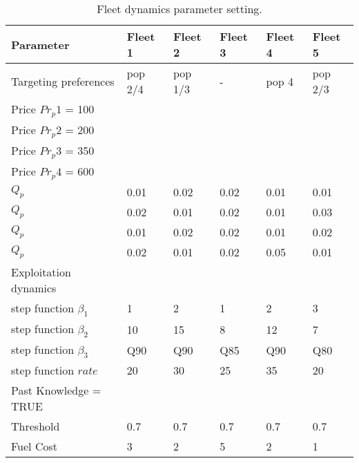\begin{table}[!ht]
\caption{Fleet dynamics parameter setting.}
\begin{tabular}{ p{4cm } p{1.2cm} p{1.2cm} p{1.2cm} p{1.2cm} p{1.2cm}}
	\hline
	Parameter & Fleet 1 & Fleet 2 & Fleet 3 & Fleet 4 & Fleet 5 \\
	\hline
	Targeting preferences & pop 2/4 & pop 1/3 & - & pop 4 & pop
	2/3 \\
	\hline
	Price $Pr_{p}1$ = 100 & & & & & \\
	Price $Pr_{p}2$ = 200 & & & & & \\
	Price $Pr_{p}3$ = 350 & & & & & \\
	Price $Pr_{p}4$ = 600 & & & & & \\
	$Q_{p}$ & 0.01 & 0.02 & 0.02 & 0.01 & 0.01 \\
	$Q_{p}$ & 0.02 & 0.01 & 0.02 & 0.01 & 0.03\\
	$Q_{p}$ & 0.01 & 0.02 & 0.02 & 0.01 & 0.02 \\
	$Q_{p}$ & 0.02 & 0.01 & 0.02 & 0.05 & 0.01 \\
	\hline
	Exploitation dynamics &&&& \\
	\hline
	step function $\beta_1$ & 1 & 2 & 1 & 2 & 3 \\
	step function $\beta_2$ & 10 & 15 & 8 & 12 & 7 \\
	step function $\beta_3$ & Q90 & Q90 & Q85 & Q90 & Q80 \\
	step function $rate$ & 20 & 30 & 25 & 35 & 20 \\
	Past Knowledge = TRUE & & & & & \\
	Threshold & 0.7 & 0.7 & 0.7 & 0.7 & 0.7 \\
	Fuel Cost & 3 & 2 & 5 & 2 & 1 \\
	\hline
\end{tabular}
\label{tab:2}
\end{table}

